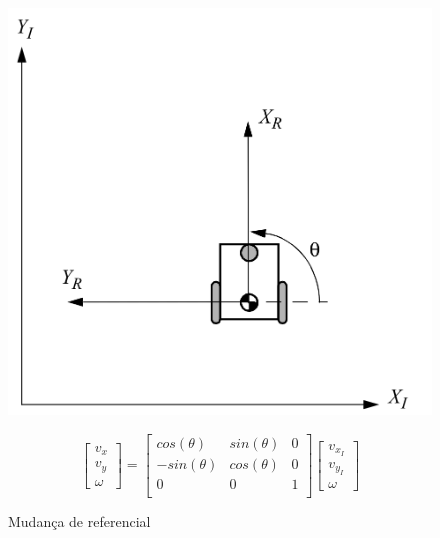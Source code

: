\begin{figure}[H]
    \centering
    \includegraphics[scale=0.3]{figuras/robo_coordenadas.png}
   
    \[
    \begin{bmatrix}
        v_x \\
        v_y \\
        \omega
    \end{bmatrix}
    =
    \begin{bmatrix}
        cos(\theta)  & sin(\theta) & 0 \\
        -sin(\theta) & cos(\theta) & 0 \\
        0 & 0 & 1 \\
    \end{bmatrix}
    \begin{bmatrix}
        v_{x_I} \\
        v_{y_I} \\
        \omega
    \end{bmatrix}
\]
\caption[]{Mudança de referencial}
\end{figure}



